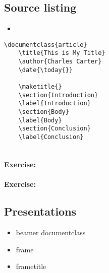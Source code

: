         \subsection{Source listing}
        \label{Source listing}
        
        \begin{framed}
            \begin{itemize}
                \item{}
            \end{itemize}
        \end{framed}


        \begin{verbatim}
\documentclass{article}
    \title{This is My Title}
    \author{Charles Carter}
    \date{\today{}}
 
    \maketitle{}
    \section{Introduction}
    \label{Introduction}
    \section{Body}
    \label{Body}
    \section{Conclusion}
    \label{Conclusion}
    
        \end{verbatim}

        \paragraph{Exercise:}

        \paragraph{Exercise:}


        \subsection{Presentations}
        \label{Presentations}
        
        \begin{framed}
            \begin{itemize}
                \item{beamer documentclass}
                \item{frame}
                \item{frametitle}
            \end{itemize}
        \end{framed}

